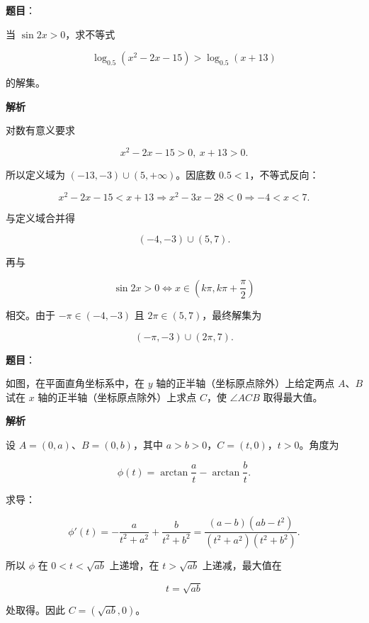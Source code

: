 \begin{answer}

\textbf{题目}：

当 $\sin2x>0$，求不等式

\nopagebreak[4]
\[
\log_{0.5}(x^2-2x-15)>\log_{0.5}(x+13)
\]

的解集。

\textbf{解析}

对数有意义要求

\nopagebreak[4]
\[
x^2-2x-15>0,\ x+13>0.
\]

所以定义域为 $(-13,-3)\cup(5,+\infty)$。因底数 $0.5<1$，不等式反向：

\nopagebreak[4]
\[
x^2-2x-15<x+13
\Longrightarrow x^2-3x-28<0
\Longrightarrow -4<x<7.
\]

与定义域合并得

\nopagebreak[4]
\[
(-4,-3)\cup(5,7).
\]

再与

\nopagebreak[4]
\[
\sin2x>0
\Longleftrightarrow
x\in\left(k\pi,k\pi+\frac\pi2\right)
\]

相交。由于 $-\pi\in(-4,-3)$ 且 $2\pi\in(5,7)$，最终解集为

\nopagebreak[4]
\[
(-\pi,-3)\cup(2\pi,7).
\]


\end{answer}
\begin{answer}

\textbf{题目}：

如图，在平面直角坐标系中，在 $y$ 轴的正半轴（坐标原点除外）上给定两点 $A\text{、}B$ 试在 $x$ 轴的正半轴（坐标原点除外）上求点 $C$，使 $\angle ACB$ 取得最大值。
\nopagebreak[4]
\begin{center}\end{center}
\nopagebreak[4]
\textbf{解析}

设 $A=(0,a)$、$B=(0,b)$，其中 $a>b>0$，$C=(t,0)$，$t>0$。角度为

\nopagebreak[4]
\[
\phi(t)=\arctan\frac at-\arctan\frac bt.
\]

求导：

\nopagebreak[4]
\[
\phi'(t)
=-\frac a{t^2+a^2}+\frac b{t^2+b^2}
=\frac{(a-b)(ab-t^2)}
{(t^2+a^2)(t^2+b^2)}.
\]

所以 $\phi$ 在 $0<t<\sqrt{ab}$ 上递增，在 $t>\sqrt{ab}$ 上递减，最大值在

\nopagebreak[4]
\[
t=\sqrt{ab}
\]

处取得。因此 $C=(\sqrt{ab},0)$。


\end{answer}
